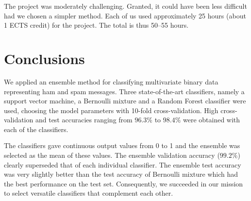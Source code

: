 The project was moderately challenging. Granted, it could have been less difficult had we chosen a simpler method. Each of us used approximately 25 hours (about 1 ECTS credit) for the project. The total is thus 50--55 hours.

\section{Conclusions}

We applied an ensemble method for classifying multivariate binary data
representing ham and spam messages. Three state-of-the-art classifiers,
namely a support vector machine, a Bernoulli mixture and a Random Forest
classifier were used, choosing the model parameters with 10-fold
cross-validation. High cross-validation and test accuracies ranging from
$96.3 \%$ to $98.4 \%$ were obtained with each of the classifiers.

The classifiers gave continuous output values from 0 to 1 and the
ensemble was selected as the mean of these values. The ensemble
validation accuracy ($99.2 \%$) clearly superseded that of each
individual classifier. The ensemble test accuracy was very slightly better than the test
accuracy of Bernoulli mixture which had the best performance on the test
set. Consequently, we succeeded in our mission to select versatile
classifiers that complement each other.
